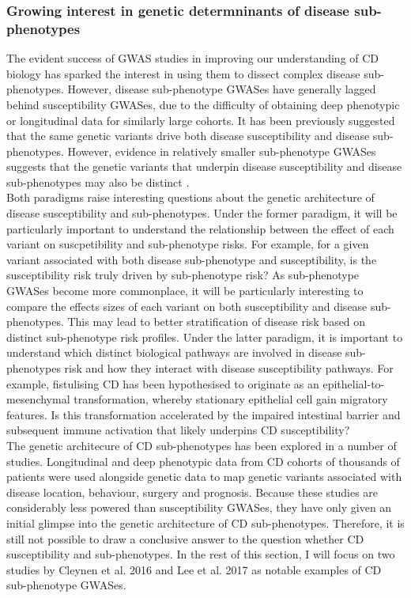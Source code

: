 \subsubsection{Growing interest in genetic determninants of disease sub-phenotypes}
The evident success of GWAS studies in improving our understanding of CD biology has sparked the interest in using them to dissect complex disease sub-phenotypes. However, disease sub-phenotype GWASes have generally lagged behind susceptibility GWASes, due to the difficulty of obtaining deep phenotypic or longitudinal data for similarly large cohorts. It has been previously suggested that the same genetic variants drive both disease susceptibility and disease sub-phenotypes. However, evidence in relatively smaller sub-phenotype GWASes suggests that the genetic variants that underpin disease susceptibility and disease sub-phenotypes may also be distinct \cite{Iwaki2019-mf,Severe_Covid-19_GWAS_Group2020-rn}.\\

Both paradigms raise interesting questions about the genetic architecture of disease susceptibility and sub-phenotypes. Under the former paradigm, it will be particularly important to understand the relationship between the effect of each variant on suscpetibility and sub-phenotype risks. For example, for a given variant associated with both disease sub-phenotype and susceptibility, is the susceptibility risk truly driven by sub-phenotype risk? As sub-phenotype GWASes become more commonplace, it will be particularly interesting to compare the effects sizes of each variant on both susceptibility and disease sub-phenotypes. This may lead to better stratification of disease risk based on distinct sub-phenotype risk profiles. Under the latter paradigm, it is important to understand which distinct biological pathways are involved in disease sub-phenotypes risk and how they interact with disease susceptibility pathways. For example, fistulising CD has been hypothesised to originate as an epithelial-to-mesenchymal transformation, whereby stationary epithelial cell gain migratory features. Is this transformation accelerated by the impaired intestinal barrier and subsequent immune activation that likely underpins CD susceptibility?\\

The genetic architecure of CD sub-phenotypes has been explored in a number of studies. Longitudinal and deep phenotypic data from CD cohorts of thousands of patients were used alongside genetic data to map genetic variants associated with disease location, behaviour, surgery and prognosis. Because these studies are considerably less powered than susceptibility GWASes, they have only given an initial glimpse into the genetic architecture of CD sub-phenotypes. Therefore, it is still not possible to draw a conclusive answer to the question whether CD susceptibility and sub-phenotypes. In the rest of this section, I will focus on two studies by Cleynen et al. 2016 \cite{Cleynen2016-ha} and Lee et al. 2017 \cite{Lee2017-tl} as notable examples of CD sub-phenotype GWASes. \\

